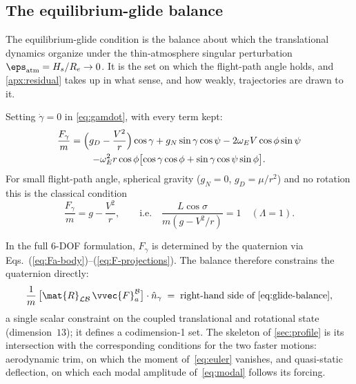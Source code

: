 \subsection{The equilibrium-glide balance}\label{sec:glide-manifold}

The equilibrium-glide condition is the balance about which the
translational dynamics organize under the thin-atmosphere singular
perturbation $\eps_{\mathrm{atm}} = H_s/R_e \to 0$. It is the set on which
the flight-path angle holds, and \cref{apx:residual} takes up in what
sense, and how weakly, trajectories are drawn to it.

Setting $\dot\gamma = 0$ in \cref{eq:gamdot}, with every term kept:
\begin{multline}\label{eq:glide-balance}
  \frac{F_\gamma}{m}
  = \Bigl(g_D - \frac{V^2}{r}\Bigr)\cos\gamma
    + g_N\sin\gamma\cos\psi
    - 2\omega_E V\cos\phi\sin\psi \\
    - \omega_E^2 r\cos\phi
      \bigl[\cos\gamma\cos\phi + \sin\gamma\cos\psi\sin\phi\bigr].
\end{multline}
For small flight-path angle, spherical gravity ($g_N = 0$,
$g_D = \mu/r^2$) and no rotation this is the classical condition
\begin{equation}\label{eq:glide-3dof}
  \frac{F_\gamma}{m} = g - \frac{V^2}{r},
  \qquad\text{i.e.}\quad
  \frac{L\cos\sigma}{m(g - V^2/r)} = 1
  \quad(\Lambda = 1).
\end{equation}

In the full 6-DOF formulation, $F_\gamma$ is determined by the quaternion
via Eqs.~(\ref{eq:Fa-body})--(\ref{eq:F-projections}). The balance
therefore constrains the quaternion directly:
\begin{equation}\label{eq:glide-full}
  \frac{1}{m}\,\bigl[\mat{R}_{\mathcal{L}\mathcal{B}}\,
         \vvec{F}_a^{\mathcal{B}}\bigr]
  \cdot\hat{n}_\gamma
  \;=\; \text{right-hand side of \cref{eq:glide-balance}},
\end{equation}
a single scalar constraint on the coupled translational and rotational state
(dimension~$13$); it defines a codimension-1 set. The skeleton of
\cref{sec:profile} is its intersection with the corresponding conditions
for the two faster motions: aerodynamic trim, on which the moment
of~\cref{eq:euler} vanishes, and quasi-static deflection, on which each
modal amplitude of~\cref{eq:modal} follows its forcing.


